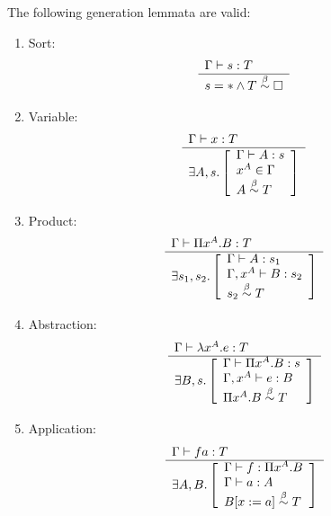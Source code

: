 \begin{theorem}
    \label{GenerationLemmata}
    The following generation lemmata are valid:
    \begin{enumerate}
    \item Sort:
        $$
        \begin{array}{l} 
            \Gamma \vdash s : T
         \\ \hline 
            s = * \land T \stackrel{\beta}{\sim} \Box
        \end{array}
        $$

    \item Variable:
        $$
        \begin{array}{l} 
            \Gamma \vdash x : T
         \\ \hline 
            \exists A,s .
            \left[
            \begin{array}{l}
                \Gamma \vdash A : s
                \\
                x^A \in \Gamma
                \\
                A \stackrel{\beta}{\sim} T
            \end{array}
            \right]
        \end{array}
        $$

    \item Product:
        $$
        \begin{array}{l} 
            \Gamma \vdash \Pi x^A.B : T
         \\ \hline 
            \exists s_1, s_2.
            \left[
            \begin{array}{l}
                \Gamma \vdash A: s_1
                \\
                \Gamma, x^A \vdash B: s_2
                \\
                s_2 \stackrel{\beta}{\sim} T
            \end{array}
            \right]
        \end{array}
        $$

    \item Abstraction:
        $$
        \begin{array}{l} 
            \Gamma \vdash \lambda x^A. e : T
         \\ \hline 
            \exists B, s.
            \left[
            \begin{array}{l}
                \Gamma \vdash \Pi x^A. B: s
                \\
                \Gamma, x^A \vdash e: B
                \\
                \Pi x^A. B  \stackrel{\beta}{\sim} T
            \end{array}
            \right]
        \end{array}
        $$

    \item Application:
        $$
        \begin{array}{l} 
            \Gamma \vdash f a: T
         \\ \hline 
            \exists A, B.
            \left[
            \begin{array}{l}
                \Gamma \vdash f : \Pi x^A. B
                \\
                \Gamma \vdash a : A
                \\
                B[x:=a]  \stackrel{\beta}{\sim} T
            \end{array}
            \right]
        \end{array}
        $$
    \end{enumerate}


\end{theorem}
